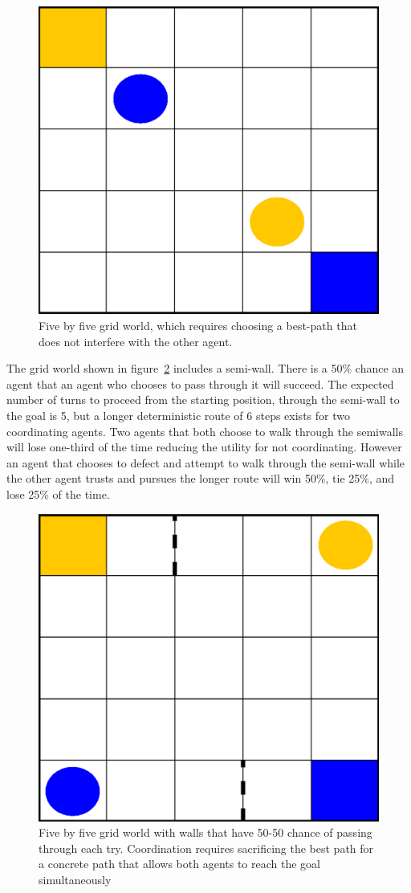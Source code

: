 \documentclass[letterpaper]{article}
\begin{document}
\begin{figure}
\centering
\includegraphics[width=0.8\columnwidth]{figures/fivebyfivenowalls.png}
\caption{Five by five grid world, which requires choosing a best-path that does not interfere with the other agent.}
\label{fig:fivebyfivenowalls}
\end{figure}

The grid world shown in figure~\ref{fig:fivebyfivesemiwalls} includes a semi-wall. There is a 50\% chance an agent that an agent who chooses to pass through it will succeed. The expected number of turns to proceed from the starting position, through the semi-wall to the goal is 5, but a longer deterministic route of 6 steps exists for two coordinating agents. Two agents that both choose to walk through the semiwalls will lose one-third of the time reducing the utility for not coordinating. However an agent that chooses to defect and attempt to walk through the semi-wall while the other agent trusts and pursues the longer route will win 50\%, tie 25\%, and lose 25\% of the time.

\begin{figure}
\centering
\includegraphics[width=0.8\columnwidth]{figures/fivebyfivesemiwalls.png}
\caption{Five by five grid world with walls that have 50-50 chance of passing through each try. Coordination requires sacrificing the best path for a concrete path that allows both agents to reach the goal simultaneously}
\label{fig:fivebyfivesemiwalls}
\end{figure}
\end{document}
